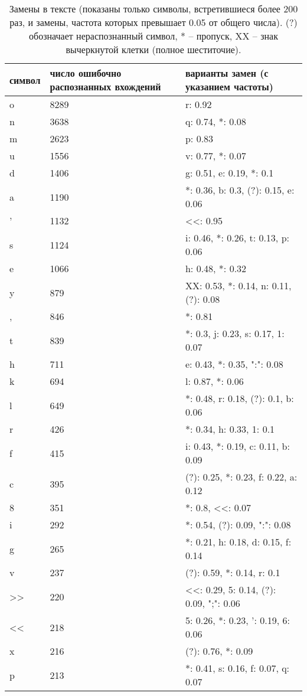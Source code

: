 \documentclass{main.tex}[subfiles]
\begin{document}
\newpage
{}

\begin{table}[H]
    \centering
    \caption{Замены в тексте (показаны только символы, встретившиеся более 200 раз, и замены, частота которых превышает 0.05 от общего числа). (?) обозначает нераспознанный символ, * -- пропуск, XX -- знак вычеркнутой клетки (полное шеститочие).}
    \begin{tabular}{l p{} l}
        \hline
        символ & число ошибочно распознанных вхождений & варианты замен (с указанием частоты) \\
        \hline
        o & 8289 & r: 0.92 \\
        n & 3638 & q: 0.74, *: 0.08 \\
        m & 2623 & p: 0.83 \\
        u & 1556 & v: 0.77, *: 0.07 \\
        d & 1406 & g: 0.51, e: 0.19, *: 0.1 \\
        a & 1190 & *: 0.36, b: 0.3, (?): 0.15, e: 0.06 \\
        ' & 1132 & <<: 0.95 \\
        s & 1124 & i: 0.46, *: 0.26, t: 0.13, p: 0.06 \\
        e & 1066 & h: 0.48, *: 0.32 \\
        y & 879 & XX: 0.53, *: 0.14, n: 0.11, (?): 0.08 \\
        , & 846 & *: 0.81 \\
        t & 839 & *: 0.3, j: 0.23, s: 0.17, 1: 0.07 \\
        h & 711 & e: 0.43, *: 0.35, ":": 0.08 \\
        k & 694 & l: 0.87, *: 0.06 \\
        l & 649 & *: 0.48, r: 0.18, (?): 0.1, b: 0.06 \\
        r & 426 & *: 0.34, h: 0.33, 1: 0.1 \\
        f & 415 & i: 0.43, *: 0.19, c: 0.11, b: 0.09 \\
        c & 395 & (?): 0.25, *: 0.23, f: 0.22, a: 0.12 \\
        8 & 351 & *: 0.8, <<: 0.07 \\
        i & 292 & *: 0.54, (?): 0.09, ":": 0.08 \\
        g & 265 & *: 0.21, h: 0.18, d: 0.15, f: 0.14 \\
        v & 237 & (?): 0.59, *: 0.14, r: 0.1 \\
        >> & 220 & <<: 0.29, 5: 0.14, (?): 0.09, ";": 0.06 \\
        << & 218 & 5: 0.26, *: 0.23, ': 0.19, 6: 0.06 \\
        x & 216 & (?): 0.76, *: 0.09 \\
        p & 213 & *: 0.41, s: 0.16, f: 0.07, q: 0.07 \\
        \hline
    \end{tabular}
    \label{table:per_letter_errs}
\end{table}
\end{document}
